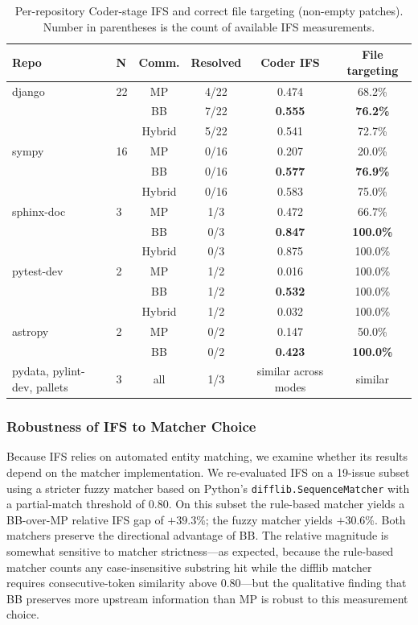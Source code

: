 \documentclass{ieeeaccess}
\begin{document}
\begin{table}[!ht]
\centering
\caption{Per-repository Coder-stage IFS and correct file targeting (non-empty patches). Number in parentheses is the count of available IFS measurements.}
\label{tab:per-repo-ifs}
\begin{tabular}{llcccc}
\toprule
\textbf{Repo} & \textbf{N} & \textbf{Comm.} & \textbf{Resolved} & \textbf{Coder IFS} & \textbf{File targeting} \\
\midrule
django      & 22 & MP & 4/22 & 0.474 & 68.2\% \\
            &    & BB & 7/22 & \textbf{0.555} & \textbf{76.2\%} \\
            &    & Hybrid & 5/22 & 0.541 & 72.7\% \\
\midrule
sympy       & 16 & MP & 0/16 & 0.207 & 20.0\% \\
            &    & BB & 0/16 & \textbf{0.577} & \textbf{76.9\%} \\
            &    & Hybrid & 0/16 & 0.583 & 75.0\% \\
\midrule
sphinx-doc  & 3  & MP & 1/3  & 0.472 & 66.7\% \\
            &    & BB & 0/3  & \textbf{0.847} & \textbf{100.0\%} \\
            &    & Hybrid & 0/3  & 0.875 & 100.0\% \\
\midrule
pytest-dev  & 2  & MP & 1/2  & 0.016 & 100.0\% \\
            &    & BB & 1/2  & \textbf{0.532} & 100.0\% \\
            &    & Hybrid & 1/2  & 0.032 & 100.0\% \\
\midrule
astropy     & 2  & MP & 0/2  & 0.147 & 50.0\% \\
            &    & BB & 0/2  & \textbf{0.423} & \textbf{100.0\%} \\
\midrule
pydata, pylint-dev, pallets & 3 & all & 1/3 & similar across modes & similar \\
\bottomrule
\end{tabular}
\end{table}

\subsubsection{Robustness of IFS to Matcher Choice}
\label{sec:ifs-robustness}

Because IFS relies on automated entity matching, we examine whether its results depend on the matcher implementation. We re-evaluated IFS on a 19-issue subset using a stricter fuzzy matcher based on Python's \texttt{difflib.SequenceMatcher} with a partial-match threshold of $0.80$. On this subset the rule-based matcher yields a BB-over-MP relative IFS gap of $+39.3$\%; the fuzzy matcher yields $+30.6$\%. Both matchers preserve the directional advantage of BB. The relative magnitude is somewhat sensitive to matcher strictness---as expected, because the rule-based matcher counts any case-insensitive substring hit while the difflib matcher requires consecutive-token similarity above $0.80$---but the qualitative finding that BB preserves more upstream information than MP is robust to this measurement choice.
\end{document}
